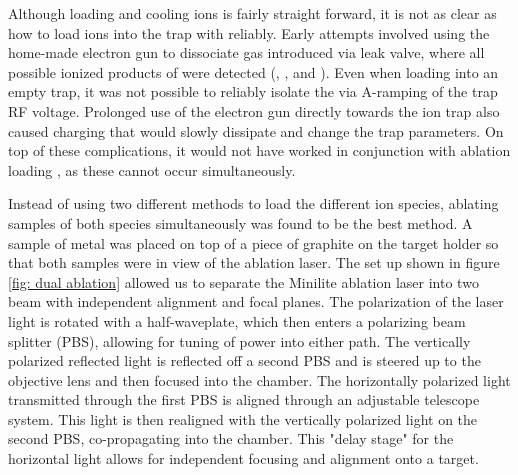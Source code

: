 Although loading and cooling  ions is fairly straight forward, it is not as clear as how to load  ions into the trap with  reliably. Early attempts involved using the home-made electron gun to dissociate  gas introduced via leak valve, where all possible ionized products of  were detected (, , and ). Even when loading into an empty trap, it was not possible to reliably isolate the  via A-ramping of the trap RF voltage. Prolonged use of the electron gun directly towards the ion trap also caused charging that would slowly dissipate and change the trap parameters. On top of these complications, it would not have worked in conjunction with ablation loading , as these cannot occur simultaneously.

Instead of using two different methods to load the different ion species, ablating samples of both species simultaneously was found to be the best method. A sample of  metal was placed on top of a piece of graphite on the target holder so that both samples were in view of the ablation laser. The set up shown in figure \ref{fig: dual ablation} allowed us to separate the Minilite ablation laser into two beam with independent alignment and focal planes. The polarization of the laser light is rotated with a half-waveplate, which then enters a polarizing beam splitter (PBS), allowing for tuning of power into either path. The vertically polarized reflected light is reflected off a second PBS and is steered up to the objective lens and then focused into the chamber. The horizontally polarized light transmitted through the first PBS is aligned through an adjustable telescope system. This light is then realigned with the vertically polarized light on the second PBS, co-propagating into the chamber. This "delay stage" for the horizontal light allows for independent focusing and alignment onto a target.

